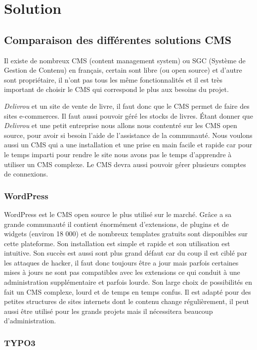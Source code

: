 \documentclass[a4paper,12pt]{report}
\begin{document}
\part{Solution}
\chapter{Comparaison des différentes solutions CMS}

Il existe de nombreux CMS (content management system) ou SGC (Système
de Gestion de Contenu) en français, certain sont libre (ou open source)
et d'autre sont propriétaire, il n'ont pas tous les même fonctionnalités
et il est très important de choisir le CMS qui correspond le plus aux
besoins du projet.

\textit{Delivrou} et un site de vente de livre, il faut donc que le CMS
permet de faire des sites e-commerces. Il faut aussi pouvoir géré les
stocks de livres. Étant donner que \textit{Delivrou} et une petit
entreprise nous allons nous contentré sur les CMS open source, pour
avoir si besoin l'aide de l'assistance de la communauté. Nous voulons
aussi un CMS qui a une installation et une prise en main facile et rapide
car pour le temps imparti pour rendre le site nous avons pas le temps
d'apprendre à utiliser un CMS complexe. Le CMS devra aussi pouvoir gérer
plusieurs comptes de connexions.

\section{WordPress}

WordPress est le CMS open source le plus utilisé sur le marché. Grâce
a sa grande communauté il contient énormément d’extensions, de plugins
et de widgets (environ 18 000) et de nombreux templates gratuits sont
disponibles sur cette plateforme. Son installation est simple et
rapide et son utilisation est intuitive.  Son succès est aussi sont
plus grand défaut car du coup il est ciblé par les attaques de hacker,
il faut donc toujours être a jour mais parfois certaines mises à jours
ne sont pas compatibles avec les extensions ce qui conduit à une
administration supplémentaire et parfois lourde. Son large choix de
possibilités en fait un CMS complexe, lourd et de temps en temps
confus.  Il est adapté pour des petites structures de sites internets
dont le contenu change régulièrement, il peut aussi être utilisé pour
les grands projets mais il nécessitera beaucoup d'administration.

\section{TYPO3}
\end{document}
